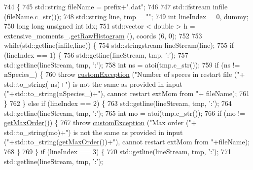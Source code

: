 \begin{DoxyCode}
744                                                                                          \{
745     std::string fileName = prefix+\textcolor{stringliteral}{".dat"};
746 
747     std::ifstream infile (fileName.c\_str());
748     std::string line, tmp = \textcolor{stringliteral}{""};
749     \textcolor{keywordtype}{int} lineIndex = 0, dummy;
750     \textcolor{keywordtype}{long} \textcolor{keywordtype}{long} \textcolor{keywordtype}{unsigned} \textcolor{keywordtype}{int} idx;
751     std::vector < double > h = extensive\_moments\_.\hyperlink{classhistogram_afa81289dc32207eb3c44f8bd746f0d1d}{getRawHistogram} (), coords (6, 0);
752 
753     \textcolor{keywordflow}{while}(std::getline(infile,line)) \{
754         std::stringstream lineStream(line);
755         \textcolor{keywordflow}{if} (lineIndex == 1) \{
756             std::getline(lineStream, tmp, \textcolor{charliteral}{':'});
757             std::getline(lineStream, tmp, \textcolor{charliteral}{':'});
758             \textcolor{keywordtype}{int} ns = atoi(tmp.c\_str());
759             \textcolor{keywordflow}{if} (ns != nSpecies\_) \{
760                 \textcolor{keywordflow}{throw} \hyperlink{classcustom_exception}{customException} (\textcolor{stringliteral}{"Number of speces in restart file ("}+ std::to\_string(
      ns)+\textcolor{stringliteral}{") is not the same as provided in input ("}+std::to\_string(nSpecies\_)+\textcolor{stringliteral}{"), cannot restart extMom from "}+
      fileName);
761             \}
762         \} \textcolor{keywordflow}{else} \textcolor{keywordflow}{if} (lineIndex == 2) \{
763             std::getline(lineStream, tmp, \textcolor{charliteral}{':'});
764             std::getline(lineStream, tmp, \textcolor{charliteral}{':'});
765             \textcolor{keywordtype}{int} mo = atoi(tmp.c\_str());
766             \textcolor{keywordflow}{if} (mo != \hyperlink{classsim_system_afe08187d318113c33bda890c69570c36}{getMaxOrder}()) \{
767                 \textcolor{keywordflow}{throw} \hyperlink{classcustom_exception}{customException} (\textcolor{stringliteral}{"Max order ("}+ std::to\_string(mo)+\textcolor{stringliteral}{") is not the same
       as provided in input ("}+std::to\_string(\hyperlink{classsim_system_afe08187d318113c33bda890c69570c36}{getMaxOrder}())+\textcolor{stringliteral}{"), cannot restart extMom from "}+fileName);
768             \}
769         \} \textcolor{keywordflow}{if} (lineIndex == 3) \{
770             std::getline(lineStream, tmp, \textcolor{charliteral}{':'});
771             std::getline(lineStream, tmp, \textcolor{charliteral}{':'});

\end{DoxyCode}
